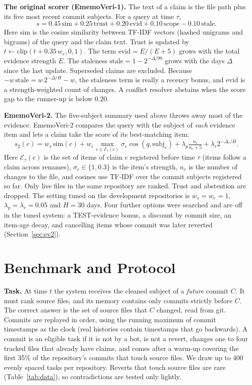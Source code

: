 \documentclass[runningheads]{llncs}
\newcommand{\sys}{EmemoVeri}
\begin{document}
\textbf{The original scorer (\sys{}-1).} The text of a claim is the file path plus its five most recent commit subjects. For a query at time $\tau$,
\begin{equation}
s = 0.45\,\mathrm{sim} + 0.25\,\mathrm{trust} + 0.20\,\mathrm{evid} + 0.10\,\mathrm{scope} - 0.10\,\mathrm{stale}.
\end{equation}
Here $\mathrm{sim}$ is the cosine similarity between TF-IDF vectors (hashed unigrams and bigrams) of the query and the claim text. Trust is updated by $t\leftarrow\mathrm{clip}(t+0.35\,w_e,0,1)$. The term $\mathrm{evid}=E/(E+5)$ grows with the total evidence strength $E$. The staleness $\mathrm{stale}=1-2^{-\Delta/90}$ grows with the days $\Delta$ since the last update. Superseded claims are excluded. Because $-w\,\mathrm{stale}=w\,2^{-\Delta/H}-w$, the staleness term is really a recency bonus, and $\mathrm{evid}$ is a strength-weighted count of changes. A conflict resolver abstains when the score gap to the runner-up is below 0.20.

\textbf{\sys{}-2.} The five-subject summary used above throws away most of the evidence. \sys{}-2 compares the query with the subject of \emph{each} evidence item and lets a claim take the score of its best-matching item:
\begin{equation}
s_2(c)=w_s\,\mathrm{sim}(c)+w_e\max_{e\in\mathcal{E}_\tau(c)}\sigma_e\cos(q,\mathrm{subj}_e)+\lambda_p\tfrac{n_c}{n_c+5}+\lambda_r 2^{-\Delta_c/H}.
\end{equation}
Here $\mathcal{E}_\tau(c)$ is the set of items of claim $c$ registered before time $\tau$ (items follow a claim across renames), $\sigma_e\in\{1,0.3\}$ is the item's strength, $n_c$ is the number of changes to the file, and cosines use TF-IDF over the commit subjects registered so far. Only live files in the same repository are ranked. Trust and abstention are dropped. The setting tuned on the development repositories is $w_s=w_e=1$, $\lambda_p=\lambda_r=0.05$ and $H=30$ days. Four further options were searched and are off in the tuned system: a TEST-evidence bonus, a discount by commit size, an item-age decay, and cancelling items whose commit was later reverted (Section~\ref{sec:ev2}).

\section{Benchmark and Protocol}
\label{sec:bench}
\textbf{Task.} At time $t$ the system receives the cleaned subject of a \emph{future} commit $C$. It must rank source files, and its memory contains only commits strictly before $C$. The correct answer is the set of source files that $C$ changed, read from git. Commits are replayed in order, using the running maximum of commit timestamps as the clock (real histories contain timestamps that go backwards). A commit is an eligible task if it is not by a bot, is not a revert, changes one to four tracked files that already have claims, and comes after a warm-up covering the first 35\% of the repository's commits that touch source files. We draw up to 400 evenly spaced tasks per repository. Reverts that touch source files are rare (Table~\ref{tab:data}), so contradictions are tested only lightly.
\end{document}
